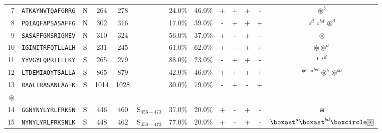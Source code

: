 \begin{tabular}{rcccccccccccc}
7  &  \texttt{ATKAYNVTQAFGRRG} &       N &    264 &   278 &                &                          24.0\% &                           46.0\% &          + &           + &          + &           - &                                                                                     $ \circledast^b $ \\
8  &  \texttt{PQIAQFAPSASAFFG} &       N &    302 &   316 &                &                          17.0\% &                           39.0\% &          - &           + &          + &           + &                                                                  $ \circ^d \circ^{bd} \circledast^d $ \\
9  &  \texttt{SASAFFGMSRIGMEV} &       N &    310 &   324 &                &                          56.0\% &                           37.0\% &          + &           - &          + &           - &                                                                                       $ \circledast $ \\
10 &  \texttt{IGINITRFQTLLALH} &       S &    231 &   245 &                &                          61.0\% &                           62.0\% &          + &           - &          + &           + &                                                                         $ \circledast \circledast^d $ \\
11 &  \texttt{YYVGYLQPRTFLLKY} &       S &    265 &   279 &                &                          88.0\% &                           23.0\% &          - &           + &          + &           - &                                                                                       $ \ast \ast^d $ \\
12 &  \texttt{LTDEMIAQYTSALLA} &       S &    865 &   879 &                &                          42.0\% &                           46.0\% &          + &           + &          + &           + &                                                   $ \ast^b \ast^{bd} \circledast^b \circledast^{bd} $ \\
13 &  \texttt{RAAEIRASANLAATK} &       S &   1014 &  1028 &                &                          30.0\% &                           79.0\% &          - &           + &          - &           + &                                 \Centerstack{  $\circ \circ^b \circ^d \circ^{bd}$ \\  $\circledast$ } \\
14 &  \texttt{GGNYNYLYRLFRKSN} &       S &    446 &   460 &  S$_{456-473}$ &                          37.0\% &                           20.0\% &          + &           - &          + &           - &                                                                                           $ \boxast $ \\
15 &  \texttt{NYNYLYRLFRKSNLK} &       S &    448 &   462 &  S$_{456-473}$ &                          77.0\% &                           20.0\% &          + &           - &          + &           - &                 $ \boxast^d \boxast^{bd} \boxcircle \setlength{\fboxsep}{0.5pt} \boxed{\circledast} $ \\
\bottomrule
\end{tabular}
